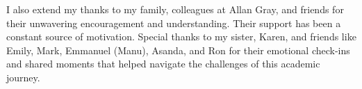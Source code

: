 I also extend my thanks to my family, colleagues at Allan Gray, and friends for their unwavering encouragement and understanding. Their support has been a constant source of motivation. Special thanks to my sister, Karen, and friends like Emily, Mark, Emmanuel (Manu), Asanda, and Ron for their emotional check-ins and shared moments that helped navigate the challenges of this academic journey.
